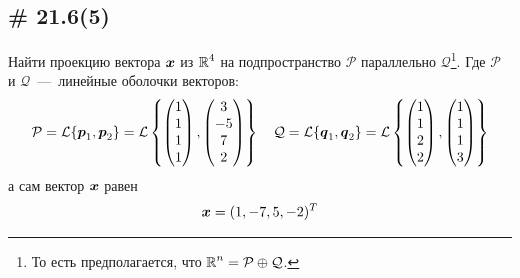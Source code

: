 \documentclass[a4paper,12pt]{article}
\begin{document}
  
  \subsection{\# 21.6(5)}
  
  Найти проекцию вектора $\boldsymbol x$ из $\operatorname{\mathbb R}^4$ на подпространство $\mathcal P$ параллельно $\mathcal Q$\footnote{То есть предполагается, что $\RR^n = \mathcal P \hm\oplus \mathcal Q$.}.
  Где $\mathcal P$ и $\mathcal Q$~---~линейные оболочки векторов:
  \[
    \mathcal P = \mathcal L \{\boldsymbol p_1, \boldsymbol p_2\} = \mathcal L \left\{
      \begin{pmatrix}
        1 \\ 1 \\ 1 \\ 1
      \end{pmatrix},
      \begin{pmatrix}
        3 \\ -5 \\ 7 \\ 2
      \end{pmatrix}
    \right\}
    \quad \mathcal Q = \mathcal L \{\boldsymbol q_1, \boldsymbol q_2\}  = \mathcal L \left\{
      \begin{pmatrix}
        1 \\ 1 \\ 2 \\ 2
      \end{pmatrix},
      \begin{pmatrix}
        1 \\ 1 \\ 1 \\ 3
      \end{pmatrix}
    \right\}
  \]
  а сам вектор $\boldsymbol x$ равен
  \[
    \boldsymbol x = (1, -7, 5, -2)^T
  \]
  
\end{document}
